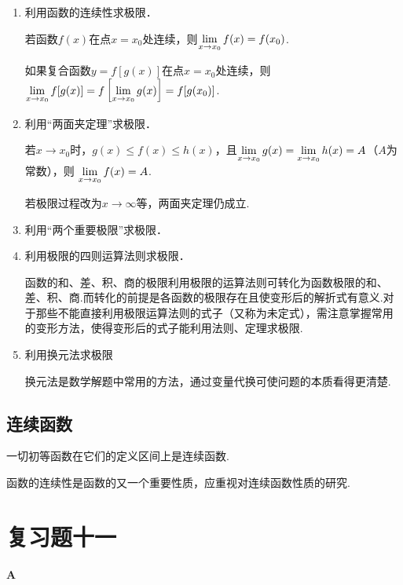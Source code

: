 \begin{enumerate}
    \item  利用函数的连续性求极限．

    若函数$f(x)$在点$x=x_0$处连续，则$\lim\limits_{x\to x_0}f(x)=f(x_0)$.

如果复合函数$y=f[g(x)]$在点$x=x_0$处连续，则$\lim\limits_{x\to x_0}f[g(x)]=f\left[\lim\limits_{x\to x_0}g(x)\right]=f[g(x_0)]$.
\item 利用“两面夹定理”求极限．

若$x\to x_0$时，$g(x)\le f(x)\le h(x)$，且$\lim\limits_{x\to x_0}g(x)=\lim\limits_{x\to x_0}h(x)=A$（$A$为常数），则
$\lim\limits_{x\to x_0}f(x)=A$.

\begin{rmk}
    若极限过程改为$x\to \infty$等，两面夹定理仍成立.
\end{rmk}

\item 利用“两个重要极限”求极限．
\item 利用极限的四则运算法则求极限．

函数的和、差、积、商的极限利用极限的运算法则可转化为函数极限的和、差、积、商.而转化的前提是各函数的极限存在且使变形后的解折式有意义.对于那些不能直接利用极限运算法则的式子（又称为未定式），需注意掌握常用的变形方法，使得变形后的式子能利用法则、定理求极限.
\item 利用换元法求极限

换元法是数学解题中常用的方法，通过变量代换可使问题的本质看得更清楚.
\end{enumerate}

\subsection*{连续函数}
一切初等函数在它们的定义区间上是连续函数.

函数的连续性是函数的又一个重要性质，应重视对连续函数性质的研究.


\section*{复习题十一}
\begin{center}
    \bfseries A
\end{center}

